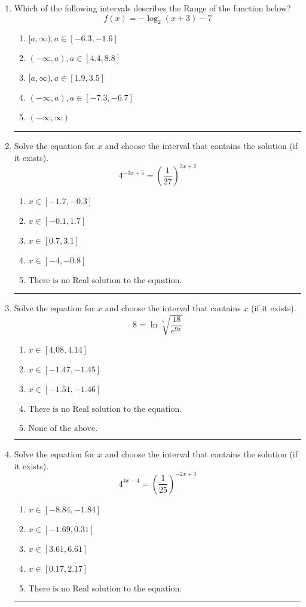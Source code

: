 \documentclass[14pt]{extbook}
\newcommand{\litem}[1]{\item#1\hspace*{-1cm}\rule{\textwidth}{0.4pt}}
\begin{document}
\begin{enumerate}
\litem{
Which of the following intervals describes the Range of the function below?\[ f(x) = -\log_2{(x+3)}-7 \]\begin{enumerate}[label=\Alph*.]
\item \( [a, \infty), a \in [-6.3, -1.6] \)
\item \( (-\infty, a), a \in [4.4, 8.8] \)
\item \( [a, \infty), a \in [1.9, 3.5] \)
\item \( (-\infty, a), a \in [-7.3, -6.7] \)
\item \( (-\infty, \infty) \)

\end{enumerate} }
\litem{
Solve the equation for $x$ and choose the interval that contains the solution (if it exists).\[ 4^{-3x+5} = \left(\frac{1}{27}\right)^{3x+2} \]\begin{enumerate}[label=\Alph*.]
\item \( x \in [-1.7, -0.3] \)
\item \( x \in [-0.1, 1.7] \)
\item \( x \in [0.7, 3.1] \)
\item \( x \in [-4, -0.8] \)
\item \( \text{There is no Real solution to the equation.} \)

\end{enumerate} }
\litem{
 Solve the equation for $x$ and choose the interval that contains $x$ (if it exists).\[  8 = \ln{\sqrt[5]{\frac{18}{e^{9x}}}} \]\begin{enumerate}[label=\Alph*.]
\item \( x \in [4.08, 4.14] \)
\item \( x \in [-1.47, -1.45] \)
\item \( x \in [-1.51, -1.46] \)
\item \( \text{There is no Real solution to the equation.} \)
\item \( \text{None of the above.} \)

\end{enumerate} }
\litem{
Solve the equation for $x$ and choose the interval that contains the solution (if it exists).\[ 4^{4x-4} = \left(\frac{1}{25}\right)^{-2x+3} \]\begin{enumerate}[label=\Alph*.]
\item \( x \in [-8.84, -1.84] \)
\item \( x \in [-1.69, 0.31] \)
\item \( x \in [3.61, 6.61] \)
\item \( x \in [0.17, 2.17] \)
\item \( \text{There is no Real solution to the equation.} \)


\end{enumerate}}
\end{enumerate}
\end{document}
